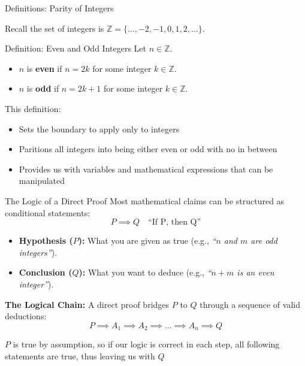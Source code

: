 \documentclass{beamer}
\begin{document}
\begin{frame}{Definitions: Parity of Integers}

  \vspace{0.5em}
  Recall the set of integers is $\mathbb{Z} = \{ \dots, -2, -1, 0, 1, 2, \dots \}$.

  \vspace{0.5em}
  \begin{block}{Definition: Even and Odd Integers}
    Let $n \in \mathbb{Z}$.
    \begin{itemize}
      \item $n$ is \textbf{even} if $n = 2k$ for some integer $k \in \mathbb{Z}$.
      \item $n$ is \textbf{odd} if $n = 2k + 1$ for some integer $k \in \mathbb{Z}$.
    \end{itemize}
  \end{block}

  \vspace{0.5em}
  This definition:
  \begin{itemize}
    \item Sets the boundary to apply only to integers
    \item Paritions all integers into being either even or odd with no in between
    \item Provides us with variables and mathematical expressions that can be manipulated
  \end{itemize}
  \vspace{0.5em}
\end{frame}

\begin{frame}{The Logic of a Direct Proof}
  Most mathematical claims can be structured as conditional statements:
  \[
    P \implies Q \quad \text{``If P, then Q''}
  \]

  \begin{itemize}
    \item \textbf{Hypothesis ($P$):} What you are given as true (e.g., \emph{``$n$ and $m$ are odd integers''}).
    \item \textbf{Conclusion ($Q$):} What you want to deduce (e.g., \emph{``$n + m$ is an even integer''}).
  \end{itemize}

  \vspace{0.5em}
  \textbf{The Logical Chain:}
  A direct proof bridges $P$ to $Q$ through a sequence of valid deductions:
  \[P \implies A_1 \implies A_2 \implies \dots \implies A_n \implies Q\]

  $P$ is true by assumption, so if our logic is correct in each step, all following statements are true, thus leaving us with $Q$
\end{frame}
\end{document}

